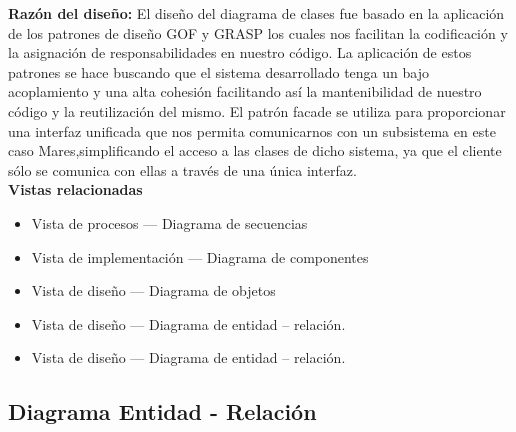 \documentclass[12pt,oneside,letterpaper]{report}
\begin{document}
\textbf{Razón del diseño:}
El diseño del diagrama de clases fue basado en la aplicación de los patrones  de diseño GOF y GRASP los cuales nos facilitan la codificación y la asignación de responsabilidades en nuestro código. La aplicación de estos patrones se hace buscando que el sistema desarrollado tenga un bajo acoplamiento y una alta cohesión facilitando así la mantenibilidad de nuestro código y la reutilización del mismo.
El patrón facade se utiliza para proporcionar una interfaz unificada que nos permita comunicarnos con un subsistema en este caso Mares,simplificando el acceso a las clases de dicho sistema, ya que el cliente sólo se comunica con ellas a través de una única interfaz.\\

\textbf{Vistas relacionadas}
\begin{itemize}
\item Vista de procesos --- Diagrama de secuencias
\item Vista de implementación --- Diagrama de componentes
\item Vista de diseño --- Diagrama de objetos
\item Vista de diseño --- Diagrama de entidad – relación.
\item Vista de diseño --- Diagrama de entidad – relación.
\end{itemize}


\subsection{Diagrama Entidad - Relación}

\end{document}
